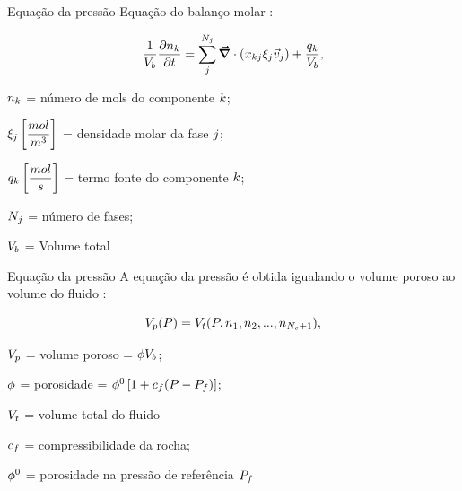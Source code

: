 \documentclass[professionalfont]{beamer}
\begin{document}
\begin{frame}{Equação da pressão}
    Equação do balanço molar \cite{Fernandes_2014}:

    \begin{equation}
        \label{eq:modelo_mat.1}
        \dfrac{1}{V_{b}} \frac{\partial n_{k}}{\partial t} = \sum_{j}^{N_{j}} \mbox{\boldmath$ \vec{\nabla} $} \cdot \left(x_{k j} \xi_{j} \vec{v}_{j} \right) + \dfrac{q_{k}}{V_{b}} ,
    \end{equation}

    \begin{description}[]
        \item $n_{k}$ = número de mols do componente $k$;
        \item $\molarDensityPhase \left[ \dfrac{mol}{\m3} \right]$ = densidade molar da fase $j$;
        \item $q_{k} \left[ \dfrac{mol}{s} \right]$ = termo fonte do componente $k$;
        \item $N_{j}$ = número de fases;
        \item $V_{b}$ = Volume total
    \end{description}
\end{frame}

\begin{frame}{Equação da pressão}
    A equação da pressão é obtida igualando o volume poroso ao volume do fluido
    \cite{Acs_1985}:

    \begin{equation}
        \label{eq:modelo_mat.2}
        V_{p} (P) = V_{t} (P, n_{1}, n_{2}, ..., n_{N_{c} + 1}),
    \end{equation}

    \begin{description}[]
        \item $V_{p}$ = volume poroso = $\phi V_{b}$;
        \item $\phi$ = porosidade = $\phi^{0} \left[1 + c_{f} (P - P_{f}) \right]$;
        \item $V_{t}$ = volume total do fluido 
        \item $c_{f}$ = compressibilidade da rocha;
        \item $\phi^{0}$ = porosidade na pressão de referência $P_{f}$
    \end{description}
    
\end{frame}
\end{document}
